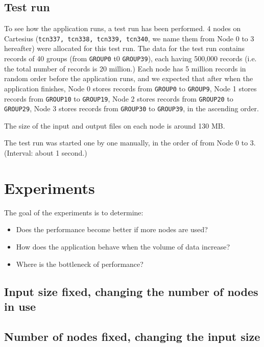 \documentclass{article}
\begin{document}
\subsection{Test run}
To see how the application runs, a test run has been performed.
4 nodes on Cartesius (\texttt{tcn337, tcn338, tcn339, tcn340}, we name them from Node 0 to 3 hereafter) were allocated for this test run.
The data for the test run contains records of 40 groups (from \texttt{GROUP0} t0 \texttt{GROUP39}), each having 500,000 records (i.e. the total number of records is 20 million.)
Each node has 5 million records in random order before the application runs, and we expected that after when the application finishes,
Node 0 stores records from \texttt{GROUP0} to \texttt{GROUP9},
Node 1 stores records from \texttt{GROUP10} to \texttt{GROUP19},
Node 2 stores records from \texttt{GROUP20} to \texttt{GROUP29},
Node 3 stores records from \texttt{GROUP30} to \texttt{GROUP39}, in the ascending order.

The size of the input and output files on each node is around 130 MB.

The test run was started one by one manually, in the order of from Node 0 to 3.
(Interval: about 1 second.)


\section{Experiments}


The goal of the experiments is to determine:
\begin{itemize}
    \item Does the performance become better if more nodes are used?
    \item How does the application behave when the volume of data increase?
    \item Where is the bottleneck of performance?
\end{itemize}

\subsection{Input size fixed, changing the number of nodes in use}

\subsection{Number of nodes fixed, changing the input size}
\end{document}
